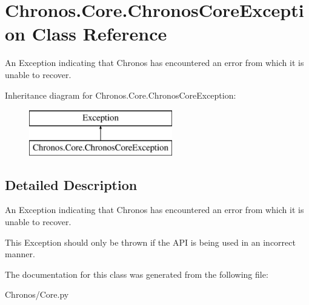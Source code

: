 \hypertarget{classChronos_1_1Core_1_1ChronosCoreException}{}\section{Chronos.\+Core.\+Chronos\+Core\+Exception Class Reference}
\label{classChronos_1_1Core_1_1ChronosCoreException}


An Exception indicating that Chronos has encountered an error from which it is unable to recover.  


Inheritance diagram for Chronos.\+Core.\+Chronos\+Core\+Exception\+:\begin{figure}[H]
\begin{center}
\leavevmode
\includegraphics[height=2.000000cm]{classChronos_1_1Core_1_1ChronosCoreException}
\end{center}
\end{figure}


\subsection{Detailed Description}
An Exception indicating that Chronos has encountered an error from which it is unable to recover. 

This Exception should only be thrown if the A\+PI is being used in an incorrect manner. 

The documentation for this class was generated from the following file\+:\begin{DoxyCompactItemize}
\item 
Chronos/Core.\+py\end{DoxyCompactItemize}
